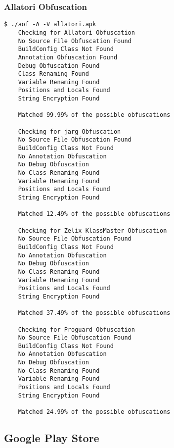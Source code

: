 \subsubsection{Allatori Obfuscation}
\label{app:allob}
\begin{lstlisting}
$ ./aof -A -V allatori.apk
    Checking for Allatori Obfuscation
	No Source File Obfuscation Found
	BuildConfig Class Not Found
	Annotation Obfuscation Found
	Debug Obfuscation Found
	Class Renaming Found
	Variable Renaming Found
	Positions and Locals Found
	String Encryption Found

	Matched 99.99% of the possible obfuscations

    Checking for jarg Obfuscation
	No Source File Obfuscation Found
	BuildConfig Class Not Found
	No Annotation Obfuscation
	No Debug Obfuscation
	No Class Renaming Found
	Variable Renaming Found
	Positions and Locals Found
	String Encryption Found

	Matched 12.49% of the possible obfuscations

    Checking for Zelix KlassMaster Obfuscation
	No Source File Obfuscation Found
	BuildConfig Class Not Found
	No Annotation Obfuscation
	No Debug Obfuscation
	No Class Renaming Found
	Variable Renaming Found
	Positions and Locals Found
	String Encryption Found

	Matched 37.49% of the possible obfuscations

    Checking for Proguard Obfuscation
	No Source File Obfuscation Found
	BuildConfig Class Not Found
	No Annotation Obfuscation
	No Debug Obfuscation
	No Class Renaming Found
	Variable Renaming Found
	Positions and Locals Found
	String Encryption Found

	Matched 24.99% of the possible obfuscations
\end{lstlisting}
\newpage
\subsection{Google Play Store}
\label{app:gpsresults}
